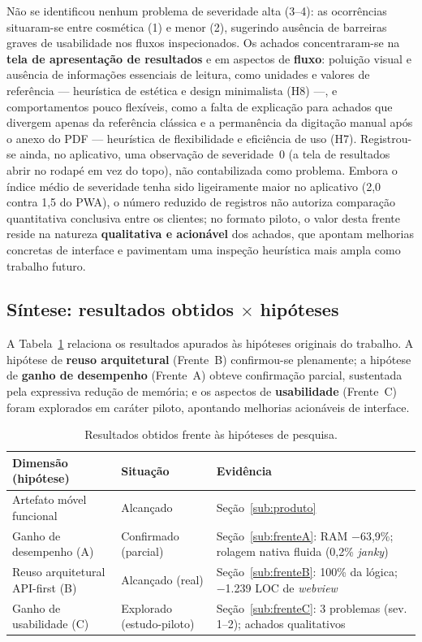 \documentclass[12pt]{article}
\begin{document}
Não se identificou nenhum problema de severidade alta (3--4): as ocorrências
situaram-se entre cosmética (1) e menor (2), sugerindo ausência de barreiras
graves de usabilidade nos fluxos inspecionados. Os achados concentraram-se na
\textbf{tela de apresentação de resultados} e em aspectos de \textbf{fluxo}:
poluição visual e ausência de informações essenciais de leitura, como unidades e
valores de referência --- heurística de estética e design minimalista (H8) ---, e
comportamentos pouco flexíveis, como a falta de explicação para achados que
divergem apenas da referência clássica e a permanência da digitação manual após o
anexo do PDF --- heurística de flexibilidade e eficiência de uso (H7). Registrou-se
ainda, no aplicativo, uma observação de severidade~0 (a tela de resultados abrir no
rodapé em vez do topo), não contabilizada como problema. Embora o índice médio de
severidade tenha sido ligeiramente maior no aplicativo (2,0 contra 1,5 do PWA), o
número reduzido de registros não autoriza comparação quantitativa conclusiva entre
os clientes; no formato piloto, o valor desta frente reside na natureza
\textbf{qualitativa e acionável} dos achados, que apontam melhorias concretas de
interface e pavimentam uma inspeção heurística mais ampla como trabalho futuro.

\subsection{Síntese: resultados obtidos $\times$ hipóteses}
\label{sub:sintese}

A Tabela~\ref{tab:sintese} relaciona os resultados apurados às hipóteses originais
do trabalho. A hipótese de \textbf{reuso arquitetural} (Frente~B) confirmou-se
plenamente; a hipótese de \textbf{ganho de desempenho} (Frente~A) obteve confirmação
parcial, sustentada pela expressiva redução de memória; e os aspectos de
\textbf{usabilidade} (Frente~C) foram explorados em caráter piloto, apontando
melhorias acionáveis de interface.

\begin{table}[H]
\centering
\caption{Resultados obtidos frente às hipóteses de pesquisa.}
\label{tab:sintese}
\footnotesize
\begin{tabular}{|p{5.6cm}|p{3.0cm}|p{5.0cm}|}
\hline
\textbf{Dimensão (hipótese)} & \textbf{Situação} & \textbf{Evidência} \\ \hline
Artefato móvel funcional & Alcançado & Seção~\ref{sub:produto} \\ \hline
Ganho de desempenho (A) & Confirmado (parcial) & Seção~\ref{sub:frenteA}: RAM $-$63,9\%; rolagem nativa fluida (0,2\% \emph{janky}) \\ \hline
Reuso arquitetural API-first (B) & Alcançado (real) & Seção~\ref{sub:frenteB}: 100\% da lógica; $-$1.239 LOC de \emph{webview} \\ \hline
Ganho de usabilidade (C) & Explorado (estudo-piloto) & Seção~\ref{sub:frenteC}: 3 problemas (sev. 1--2); achados qualitativos \\ \hline
\end{tabular}
\end{table}
\end{document}
